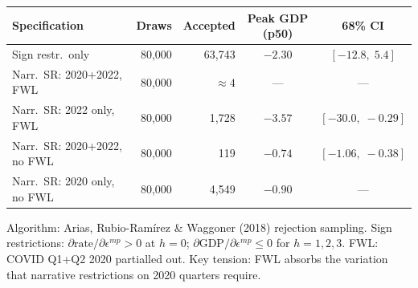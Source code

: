 
\begin{tabular}{lrrcc}
\toprule
Specification & Draws & Accepted & Peak GDP (p50) & 68\% CI \\
\midrule
    Sign restr.\ only & 80,000 & 63,743 & $-2.30$ & $[-12.8,\;5.4]$ \\
    Narr.\ SR: 2020+2022, FWL & 80,000 & $\approx4$ & --- & --- \\
    Narr.\ SR: 2022 only, FWL & 80,000 & 1,728 & $-3.57$ & $[-30.0,\;-0.29]$ \\
    Narr.\ SR: 2020+2022, no FWL & 80,000 & 119 & $-0.74$ & $[-1.06,\;-0.38]$ \\
    Narr.\ SR: 2020 only, no FWL & 80,000 & 4,549 & $-0.90$ & --- \\
\bottomrule
\end{tabular}
\begin{tablenotes}
\small Algorithm: Arias, Rubio-Ram\'{i}rez \& Waggoner (2018) rejection sampling.
Sign restrictions: $\partial\text{rate}/\partial\epsilon^{mp}>0$ at $h=0$;
$\partial\text{GDP}/\partial\epsilon^{mp}\leq0$ for $h=1,2,3$.
FWL: COVID Q1+Q2 2020 partialled out. Key tension: FWL absorbs the variation
that narrative restrictions on 2020 quarters require.
\end{tablenotes}
